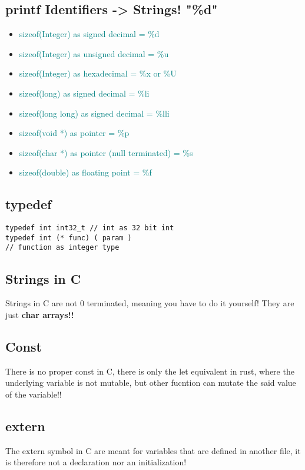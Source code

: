 \documentclass[main.tex,fontsize=8pt,paper=a4,paper=landscape,DIV=calc,]{scrartcl}
\begin{document}
\begin{multicols*}{4}
\subsection{printf Identifiers -> Strings! "\%d"}
\begin{itemize}
\item \textcolor{teal}{sizeof(Integer) as signed decimal = \%d}
\item \textcolor{teal}{sizeof(Integer) as unsigned decimal = \%u}
\item \textcolor{teal}{sizeof(Integer) as hexadecimal = \%x or \%U}
\item \textcolor{teal}{sizeof(long) as signed decimal = \%li}
\item \textcolor{teal}{sizeof(long long) as signed decimal = \%lli}
\item \textcolor{teal}{sizeof(void *) as pointer = \%p}
\item \textcolor{teal}{sizeof(char *) as pointer (null terminated) = \%s}
\item \textcolor{teal}{sizeof(double) as floating point = \%f}
\end{itemize}

\subsection{typedef}
\vspace{-2.5mm}
\begin{lstlisting}
typedef int int32_t // int as 32 bit int 
typedef int (* func) ( param )
// function as integer type
\end{lstlisting}
\vspace{2mm}

\subsection{Strings in C}
Strings in C are not 0 terminated, meaning you have to do it yourself!
They are just \textbf{char arrays!!}

\subsection{Const}
There is no proper const in C, there is only the let equivalent in rust, where the underlying variable is not mutable, but other fucntion can mutate the said value of the variable!!

\subsection{extern}
The extern symbol in C are meant for variables that are defined in another file, it is therefore not a declaration nor an initialization!


\end{multicols*}
\end{document}
